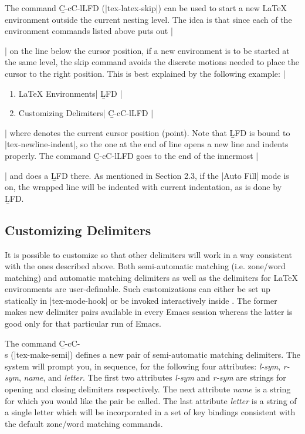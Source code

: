 {\begin{env}
\begin{minipage}
\begin{...}
\begin{...}
The command {\b C-c{\s}C-l{\s}LFD} (|tex-latex-skip|) can be used
to start a new {\LaTeX} environment outside the current nesting level.
The idea is that since each of the environment commands listed above
puts out |\end{...}| on the line below the cursor position,
if a new environment is to be started at the same level,
the skip command avoids the discrete motions needed
to place the cursor to the right position.  This is best explained
by the following example:
\begindisplay
|\begin{enumerate}|\cr
|  |$\cdots$\cr
|  \item {\LaTeX} Environments| {\b LFD}\cr
|  \item Customizing Delimiters| {\b C-c{\s}C-l{\s}LFD}\cr
|\end{enumerate}|\cr
\block\cr
\enddisplay
where {\block} denotes the current cursor position (point).
Note that {\b LFD} is bound to |tex-newline-indent|, so the one
at the end of line opens a new line and indents properly.
The command {\b C-c{\s}C-l{\s}LFD} goes to the end of
the innermost |\end{...}| and does
a {\b LFD} there.  As mentioned in Section 2.3, if the |Auto Fill| mode is on,
the wrapped line will be indented with current indentation, as is done
by {\b LFD}.

\subsection{Customizing Delimiters}

\noindent
It is possible to customize {\TM} so that other delimiters
will work in a way consistent with the ones described above.
Both semi-automatic matching (i.e. zone/word matching) and
automatic matching delimiters as well as the delimiters
for {\LaTeX} environments are user-definable.
Such customizations can either be set up statically in
|tex-mode-hook| or be invoked interactively inside {\TM}.
The former makes new delimiter pairs available in every
Emacs {\TM} session whereas the latter is good only for that particular
run of Emacs.

The command {\b C-c{\s}C-\\{\s}s} (|tex-make-semi|)
defines a new pair of semi-automatic matching delimiters.
The system will prompt you, in sequence, for the following four
attributes: {\it l-sym\/}, {\it r-sym\/}, {\it name\/}, and {\it letter\/}.
The first two attributes {\it l-sym\/} and {\it r-sym\/} are strings for opening
and closing delimiters respectively.  The next attribute
{\it name\/} is a string for which you would like the pair be called.  
The last attribute {\it letter\/} is a string of a single letter which will
be incorporated in a set of key bindings consistent with the default 
zone/word matching commands.  


\end{minipage}
\end{env}}

